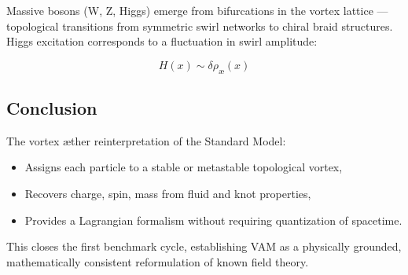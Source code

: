 Massive bosons (W, Z, Higgs) emerge from bifurcations in the vortex lattice — topological transitions from symmetric swirl networks to chiral braid structures. Higgs excitation corresponds to a fluctuation in swirl amplitude:

\begin{equation}
H(x) \sim \delta \rho_\text{\ae}(x)
\end{equation}

\subsection{Conclusion}

The vortex æther reinterpretation of the Standard Model:
\begin{itemize}
    \item Assigns each particle to a stable or metastable topological vortex,
    \item Recovers charge, spin, mass from fluid and knot properties,
    \item Provides a Lagrangian formalism without requiring quantization of spacetime.
\end{itemize}

This closes the first benchmark cycle, establishing VAM as a physically grounded, mathematically consistent reformulation of known field theory.
